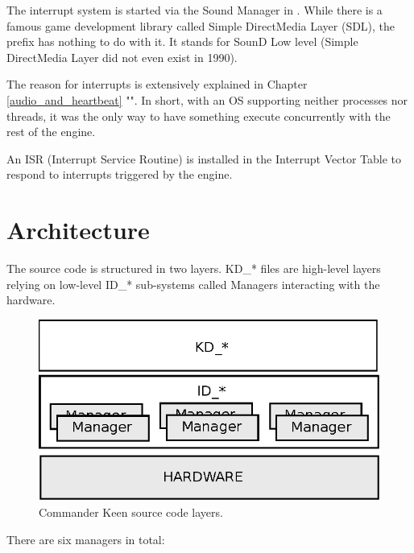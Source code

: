 \documentclass[book.tex]{subfiles}
\begin{document}
The interrupt system is started via the Sound Manager in . While there is a famous game development library called Simple DirectMedia Layer (SDL), the prefix  has nothing to do with it. It stands for SounD Low level (Simple DirectMedia Layer did not even exist in 1990).\\
\par
The reason for interrupts is extensively explained in Chapter \ref{audio_and_heartbeat} "". In short, with an OS supporting neither processes nor threads, it was the only way to have something execute concurrently with the rest of the engine.\\
\par
An ISR (Interrupt Service Routine) is installed in the Interrupt Vector Table to respond to interrupts triggered by the engine. \\
\par
\begin{minipage}{\textwidth}

\end{minipage}
\par



\pagebreak
\section{Architecture}

The source code is structured in two layers. KD\_* files are high-level layers relying on low-level ID\_* sub-systems called Managers interacting with the hardware.\\
\par
\begin{figure}[H]
\centering
\includegraphics[width=\textwidth]{imgs/drawings/layers.eps} 
\caption{Commander Keen source code layers.}
 \end{figure}
 \par
There are six managers in total:\\
\end{document}
